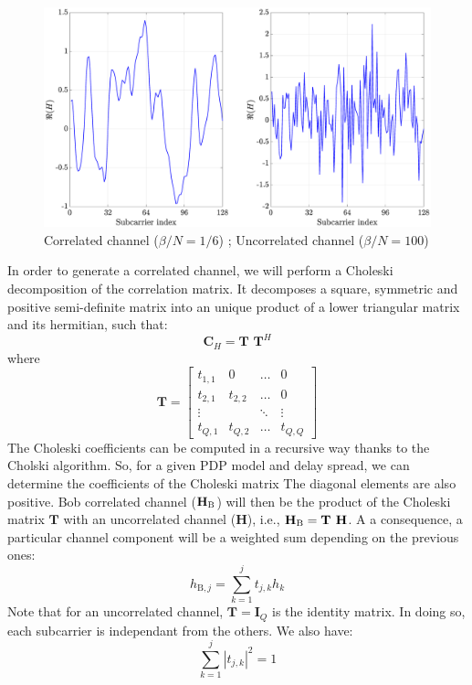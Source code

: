 \documentclass[12pt]{article}
\begin{document}
\begin{figure}[h!]
\centering
\includegraphics[width=.65\linewidth]{img/channelComparaison.eps}
\caption{Correlated channel ($\beta/N = 1/6$) ; Uncorrelated channel ($\beta/N = 100$)}
\label{fig:channel}
\end{figure} 
In order to generate a correlated channel, we will perform a Choleski decomposition of the correlation matrix. It decomposes a square, symmetric and positive semi-definite matrix into an unique product of a lower triangular matrix and its hermitian, such that:
\begin{equation}
	\textbf{C}_H = \textbf{T T}^H
\end{equation}
where
\begin{equation}
	\textbf{T} = 
	\begin{bmatrix}
	t_{1,1} & 0 & \hdots & 0 \\
	t_{2,1} & t_{2,2} & \hdots & 0 \\
	\vdots & & \ddots & \vdots \\
	t_{Q,1} & t_{Q,2} & \hdots & t_{Q,Q}
	\end{bmatrix}
\end{equation}
The Choleski coefficients can be computed in a recursive way thanks to the Cholski algorithm. So, for a given PDP model and delay spread, we can determine the coefficients of the Choleski matrix The diagonal elements are also positive. Bob correlated channel ($\textbf{H}_{\text{B}}$) will then be the product of the Choleski matrix $\textbf{T}$ with an uncorrelated channel ($\textbf{H}$), i.e., $\textbf{H}_{\text{B}} = \textbf{T H}$. A a consequence, a particular channel component will be a weighted sum depending on the previous ones:
\begin{equation}
 	h_{\text{B},j} = \sum_{k = 1}^{j} t_{j,k} h_k
 	\label{eq:corr_channel}
\end{equation}
Note that for an uncorrelated channel, $\textbf{T} = \textbf{I}_Q$ is the identity matrix. In doing so, each subcarrier is independant from the others. We also have:
\begin{equation}
	\sum_{k = 1}^{j} \left| t_{j,k}\right|^2 = 1
	\label{eq:chol_properties}
\end{equation}
\end{document}
